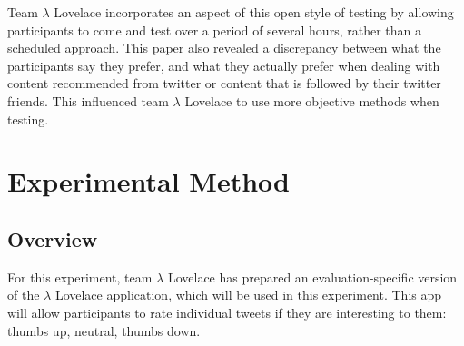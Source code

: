 \documentclass{article}
\begin{document}
Team $\lambda$ Lovelace incorporates an aspect of this open style of testing by allowing participants to come and test over a period of several hours, rather than a scheduled approach. This paper also revealed a discrepancy between what the participants say they prefer, and what they actually prefer when dealing with content recommended from twitter or content that is followed by their twitter friends. This influenced team $\lambda$ Lovelace to use more objective methods when testing.




\section{Experimental Method}
\subsection{Overview}
%
%

For this experiment, team $\lambda$ Lovelace has prepared an evaluation-specific version of the $\lambda$ Lovelace application, which will be used in this experiment. This app will allow participants to rate individual tweets if they are interesting to them: thumbs up, neutral, thumbs down.
\end{document}
